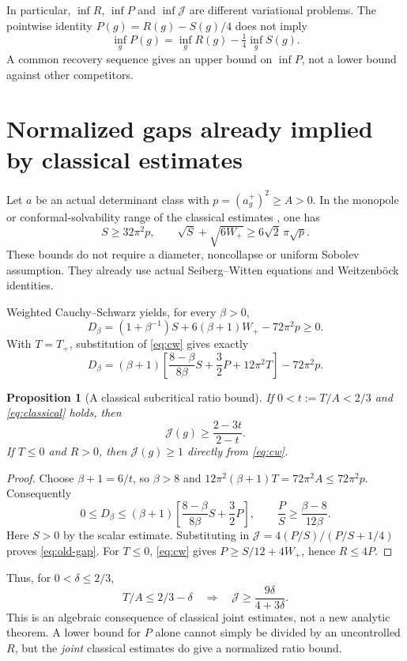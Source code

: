 \documentclass[11pt]{article}
\newtheorem{proposition}{Proposition}[section]
\theoremstyle{remark}
\newcommand{\J}{\mathcal J}
\begin{document}
In particular, $\inf R$, $\inf P$ and $\inf\J$ are different variational
problems. The pointwise identity $P(g)=R(g)-S(g)/4$ does not imply
\begin{equation}\label{eq:not-inf}
 \inf_gP(g)=\inf_gR(g)-\tfrac14\inf_gS(g).
\end{equation}
A common recovery sequence gives an upper bound on $\inf P$, not a
lower bound against other competitors.

\section{Normalized gaps already implied by classical estimates}

Let $a$ be an actual determinant class with
$p=(a_g^+)^2\ge A>0$. In the monopole or conformal-solvability range of
the classical estimates \cite{LeBrunRicci}, one has
\begin{equation}\label{eq:classical}
 S\ge32\pi^2p,\qquad
 \sqrt S+\sqrt{6W_+}\ge6\sqrt2\,\pi\sqrt p.
\end{equation}
These bounds do not require a diameter, noncollapse or uniform Sobolev
assumption. They already use actual Seiberg--Witten equations and
Weitzenb\"ock identities.

Weighted Cauchy--Schwarz yields, for every $\beta>0$,
\begin{equation}\label{eq:Dbeta}
 D_\beta=(1+\beta^{-1})S+6(\beta+1)W_+-72\pi^2p\ge0.
\end{equation}
With $T=T_+$, substitution of \eqref{eq:cw} gives exactly
\begin{equation}\label{eq:Dcw}
 D_\beta=(\beta+1)
 \left[\frac{8-\beta}{8\beta}S+\frac32P+12\pi^2T\right]
 -72\pi^2p.
\end{equation}

\begin{proposition}[A classical subcritical ratio bound]
If $0<t:=T/A<2/3$ and \eqref{eq:classical} holds, then
\begin{equation}\label{eq:old-gap}
 \J(g)\ge\frac{2-3t}{2-t}.
\end{equation}
If $T\le0$ and $R>0$, then $\J(g)\ge1$ directly from
\eqref{eq:cw}.
\end{proposition}
\begin{proof}
Choose $\beta+1=6/t$, so $\beta>8$ and
$12\pi^2(\beta+1)T=72\pi^2A\le72\pi^2p$. Consequently
\[
 0\le D_\beta\le(\beta+1)
 \left[\frac{8-\beta}{8\beta}S+\frac32P\right],
 \qquad \frac PS\ge\frac{\beta-8}{12\beta}.
\]
Here $S>0$ by the scalar estimate. Substituting in
$\J=4(P/S)/(P/S+1/4)$ proves \eqref{eq:old-gap}.
For $T\le0$, \eqref{eq:cw} gives $P\ge S/12+4W_+$, hence
$R\le4P$.
\end{proof}
Thus, for $0<\delta\le2/3$,
\begin{equation}
 T/A\le2/3-\delta\quad\Longrightarrow\quad
 \J\ge\frac{9\delta}{4+3\delta}.
\end{equation}
This is an algebraic consequence of classical joint estimates, not a new
analytic theorem. A lower bound for $P$ alone cannot simply be divided by
an uncontrolled $R$, but the \emph{joint} classical estimates do give a
normalized ratio bound.
\end{document}
